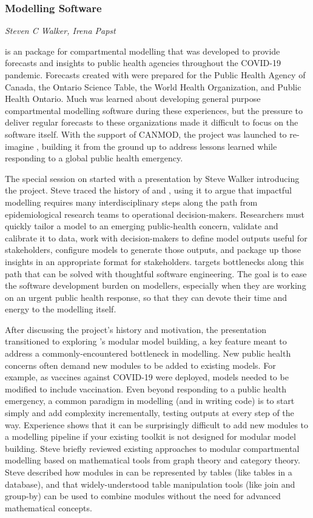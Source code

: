 \subsubsection{\macpan Modelling Software}
\label{sec:macpan}

\textit{Steven C Walker, Irena Papst}

\macpanOrig is an \R package for compartmental modelling that was developed to provide forecasts and insights to public health agencies throughout the COVID-19 pandemic. Forecasts created with \macpanOrig were prepared for the Public Health Agency of Canada, the Ontario Science Table, the World Health Organization, and Public Health Ontario. Much was learned about developing general purpose compartmental modelling software during these experiences, but the pressure to deliver regular forecasts to these organizations made it difficult to focus on the software itself. With the support of CANMOD, the \macpan project was launched to re-imagine \macpanOrig, building it from the ground up to address lessons learned while responding to a global public health emergency.

The special session on \macpan started with a presentation by Steve Walker introducing the project. Steve traced the history of \macpanOrig and \macpan, using it to argue that impactful modelling requires many interdisciplinary steps along the path from epidemiological research teams to operational decision-makers. Researchers must quickly tailor a model to an emerging public-health concern, validate and calibrate it to data, work with decision-makers to define model outputs useful for stakeholders, configure models to generate those outputs, and package up those insights in an appropriate format for stakeholders. \macpan targets bottlenecks along this path that can be solved with thoughtful software engineering. The goal is to ease the software development burden on modellers, especially when they are working on an urgent public health response, so that they can devote their time and energy to the modelling itself.

After discussing the project's history and motivation, the presentation transitioned to \newline exploring \macpan's modular model building, a key feature meant to address a commonly-encountered bottleneck in modelling. New public health concerns often demand new modules to be added to existing models. For example, as vaccines against COVID-19 were deployed, models needed to be modified to include vaccination. Even beyond responding to a public health emergency, a common paradigm in modelling (and in writing code) is to start simply and add complexity incrementally, testing outputs at every step of the way. Experience shows that it can be surprisingly difficult to add new modules to a modelling pipeline if your existing toolkit is not designed for modular model building. Steve briefly reviewed existing approaches to modular compartmental modelling based on mathematical tools from graph theory and category theory. Steve described how modules in \macpan can be represented by tables (like tables in a database), and that widely-understood table manipulation tools (like join and group-by) can be used to combine modules without the need for advanced mathematical concepts.

